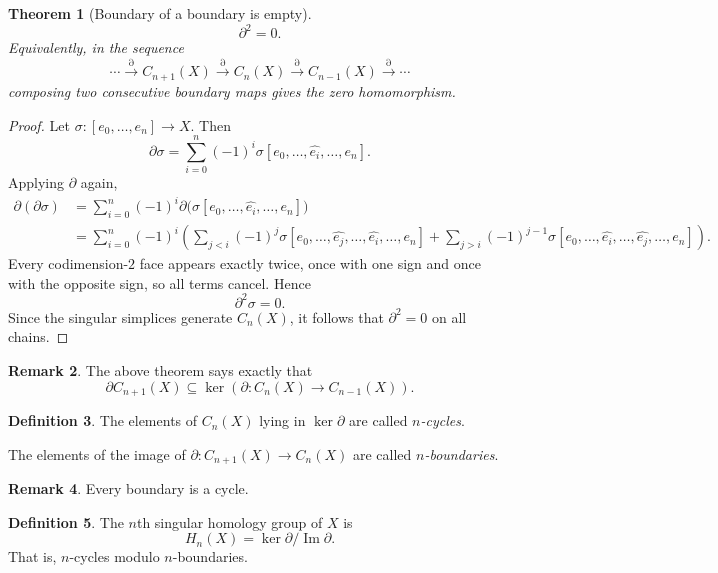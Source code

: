 \documentclass[11pt,a4paper]{article}
\theoremstyle{definition}
\newtheorem{definition}{Definition}[section]
\newtheorem{remark}[definition]{Remark}
\theoremstyle{plain}
\newtheorem{theorem}[definition]{Theorem}
\theoremstyle{remark}
\newcommand{\1}{\mathbbm{1}}
\begin{document}
\begin{theorem}[Boundary of a boundary is empty]
    \[
    \partial^2 = 0.
    \]
    Equivalently, in the sequence
    \[
    \cdots \xrightarrow{\partial} C_{n+1}(X) \xrightarrow{\partial} C_n(X)
    \xrightarrow{\partial} C_{n-1}(X) \xrightarrow{\partial} \cdots
    \]
    composing two consecutive boundary maps gives the zero homomorphism.
\end{theorem}

\begin{proof}
    Let $\sigma \colon [e_0,\dots,e_n] \to X$. Then
    \[
    \partial \sigma = \sum_{i=0}^n (-1)^i \sigma[e_0,\dots,\hat{e_i},\dots,e_n].
    \]
    Applying $\partial$ again,
    \begin{align*}
        \partial(\partial \sigma)
        &= \sum_{i=0}^n (-1)^i \partial\bigl(\sigma[e_0,\dots,\hat{e_i},\dots,e_n]\bigr) \\
        &= \sum_{i=0}^n (-1)^i
        \left(
            \sum_{j<i} (-1)^j \sigma[e_0,\dots,\hat{e_j},\dots,\hat{e_i},\dots,e_n]
            +
            \sum_{j>i} (-1)^{j-1} \sigma[e_0,\dots,\hat{e_i},\dots,\hat{e_j},\dots,e_n]
        \right).
    \end{align*}
    Every codimension-$2$ face appears exactly twice, once with one sign and once with the opposite sign,
    so all terms cancel. Hence
    \[
    \partial^2 \sigma = 0.
    \]
    Since the singular simplices generate $C_n(X)$, it follows that $\partial^2=0$ on all chains.
\end{proof}

\begin{remark}
    The above theorem says exactly that
    \[
    \partial C_{n+1}(X) \subseteq \ker(\partial \colon C_n(X)\to C_{n-1}(X)).
    \]
\end{remark}

\begin{definition}
    The elements of $C_n(X)$ lying in $\ker \partial$ are called \emph{$n$-cycles}.

    The elements of the image of $\partial \colon C_{n+1}(X)\to C_n(X)$ are called \emph{$n$-boundaries}.
\end{definition}

\begin{remark}
    Every boundary is a cycle.
\end{remark}

\begin{definition}
    The $n$th singular homology group of $X$ is
    \[
    H_n(X) = \ker \partial \big/ \operatorname{Im}\partial.
    \]
    That is, $n$-cycles modulo $n$-boundaries.
\end{definition}
\end{document}
